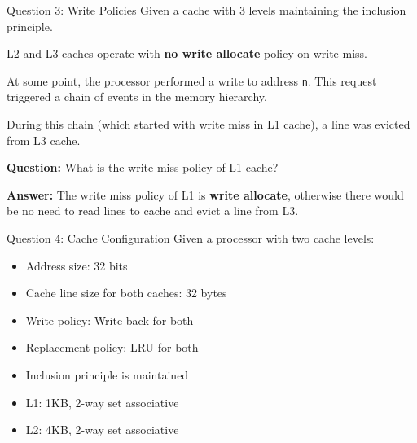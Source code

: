 \documentclass[aspectratio=169,12pt]{beamer}
\begin{document}
\begin{frame}{Question 3: Write Policies}
Given a cache with 3 levels maintaining the inclusion principle.

L2 and L3 caches operate with \textbf{no write allocate} policy on write miss.

At some point, the processor performed a write to address \texttt{n}. This request triggered a chain of events in the memory hierarchy.

During this chain (which started with write miss in L1 cache), a line was evicted from L3 cache.

\textbf{Question:} What is the write miss policy of L1 cache?

\textbf{Answer:} The write miss policy of L1 is \textbf{write allocate}, otherwise there would be no need to read lines to cache and evict a line from L3.
\end{frame}

\begin{frame}{Question 4: Cache Configuration}
Given a processor with two cache levels:
\begin{itemize}
    \item Address size: 32 bits
    \item Cache line size for both caches: 32 bytes
    \item Write policy: Write-back for both
    \item Replacement policy: LRU for both
    \item Inclusion principle is maintained
    \item L1: 1KB, 2-way set associative
    \item L2: 4KB, 2-way set associative
\end{itemize}
\end{frame}
\end{document}
